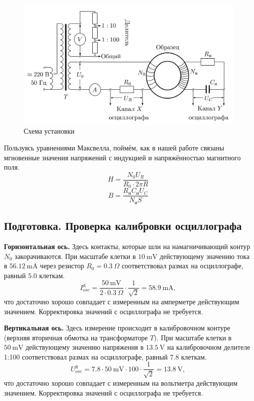 \documentclass[12pt, a4paper]{article}
\newcommand{\V}{~\mathrm{V}}
\newcommand{\mV}{~\mathrm{mV}}
\newcommand{\mA}{~\mathrm{mA}}
\begin{document}
\begin{figure}[H]
  \includegraphics[width=0.8\linewidth]{pics/setup.png}
  \caption{Схема установки}
  \label{pic_setup}
\end{figure}

Пользуясь уравнениями Максвелла, поймём, как в нашей работе связаны мгновенные значения напряжений с индукцией и напряжённостью
магнитного поля.
\begin{equation}
  H = \frac{N_0 U_R}{R_0 \cdot 2\pi R}
  \label{eq:H}
\end{equation}
\begin{equation}
  B = \frac{R_\text{и}C_\text{и} U_C}{ N_\text{и} S}
  \label{eq:B}
\end{equation}
\subsection{Подготовка. Проверка калибровки осциллографа}
\textbf{Горизонтальная ось.} Здесь контакты, которые шли на намагничивающий контур $N_0$ закорачиваются.
При масштабе клетки в $10\mV$ действующему значению тока в $56.12\mA$ через резистор
$R_0 = 0.3~\Omega$ соответствовал размах на осциллографе, равный $5.0$ клеткам.
\[I^\text{д}_{osc} = \frac{50\mV}{2\cdot 0.3~\Omega} \cdot \frac{1}{\sqrt 2} = 58.9 \mA,\]
что достаточно хорошо совпадает с измеренным на амперметре действующим значением. Корректировка значений с осциллографа не требуется.

\textbf{Вертикальная ось.} Здесь измерение происходит в калибровочном контуре (верхняя вторичная обмотка на трансформаторе $T$).
При масштабе клетки в $50\mV$ действующему значению напряжения в $13.5\V$ на калибровочном делителе
1:100 соответствовал размах на осциллографе, равный $7.8$ клеткам.
\[U^\text{д}_{osc} = {7.8\cdot 50\mV} \cdot 100\cdot  \frac{1}{\sqrt 2} = 13.8 \V,\]
что достаточно хорошо совпадает с измеренным на вольтметра действующим значением. Корректировка значений с осциллографа не требуется.
\end{document}
